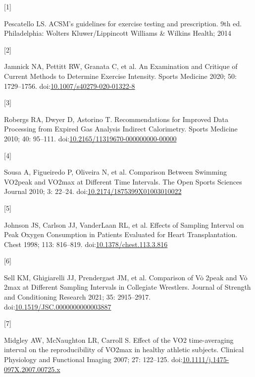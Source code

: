 \documentclass[
  letterpaper,
  DIV=11,
  numbers=noendperiod]{scrartcl}
\newlength{\cslhangindent}
\newlength{\csllabelwidth}
\newenvironment{CSLReferences}[2] %
 {\begin{list}{}{%
  \setlength{\itemindent}{0pt}
  \setlength{\leftmargin}{0pt}
  \setlength{\parsep}{0pt}
  \ifodd #1
   \setlength{\leftmargin}{\cslhangindent}
   \setlength{\itemindent}{-1\cslhangindent}
  \fi
  \setlength{\itemsep}{#2\baselineskip}}}
 {\end{list}}
\newcommand{\CSLLeftMargin}[1]{\parbox[t]{\csllabelwidth}{\strut#1\strut}}
\newcommand{\CSLRightInline}[1]{\parbox[t]{\linewidth - \csllabelwidth}{\strut#1\strut}}
\begin{document}
\label{refs}
\begin{CSLReferences}{0}{1}
\CSLLeftMargin{{[}1{]} }%
\CSLRightInline{Pescatello LS. ACSM's guidelines for exercise testing
and prescription. 9th ed. Philadelphia: Wolters Kluwer/Lippincott
Williams \& Wilkins Health; 2014}

\CSLLeftMargin{{[}2{]} }%
\CSLRightInline{Jamnick NA, Pettitt RW, Granata C, et al. An Examination
and Critique of Current Methods to Determine Exercise Intensity. Sports
Medicine 2020; 50: 1729--1756.
doi:\href{https://doi.org/10.1007/s40279-020-01322-8}{10.1007/s40279-020-01322-8}}

\CSLLeftMargin{{[}3{]} }%
\CSLRightInline{Robergs RA, Dwyer D, Astorino T. Recommendations for
Improved Data Processing from Expired Gas Analysis Indirect Calorimetry.
Sports Medicine 2010; 40: 95--111.
doi:\href{https://doi.org/10.2165/11319670-000000000-00000}{10.2165/11319670-000000000-00000}}

\CSLLeftMargin{{[}4{]} }%
\CSLRightInline{Sousa A, Figueiredo P, Oliveira N, et al. Comparison
Between Swimming VO2peak and VO2max at Different Time Intervals. The
Open Sports Sciences Journal 2010; 3: 22--24.
doi:\href{https://doi.org/10.2174/1875399X01003010022}{10.2174/1875399X01003010022}}

\CSLLeftMargin{{[}5{]} }%
\CSLRightInline{Johnson JS, Carlson JJ, VanderLaan RL, et al. Effects of
Sampling Interval on Peak Oxygen Consumption in Patients Evaluated for
Heart Transplantation. Chest 1998; 113: 816--819.
doi:\href{https://doi.org/10.1378/chest.113.3.816}{10.1378/chest.113.3.816}}

\CSLLeftMargin{{[}6{]} }%
\CSLRightInline{Sell KM, Ghigiarelli JJ, Prendergast JM, et al.
Comparison of Vȯ 2peak and Vȯ 2max at Different Sampling Intervals in
Collegiate Wrestlers. Journal of Strength and Conditioning Research
2021; 35: 2915--2917.
doi:\href{https://doi.org/10.1519/JSC.0000000000003887}{10.1519/JSC.0000000000003887}}

\CSLLeftMargin{{[}7{]} }%
\CSLRightInline{Midgley AW, McNaughton LR, Carroll S. Effect of the VȮ2
time-averaging interval on the reproducibility of VȮ2max in healthy
athletic subjects. Clinical Physiology and Functional Imaging 2007; 27:
122--125.
doi:\href{https://doi.org/10.1111/j.1475-097X.2007.00725.x}{10.1111/j.1475-097X.2007.00725.x}}


\end{CSLReferences}
\end{document}
